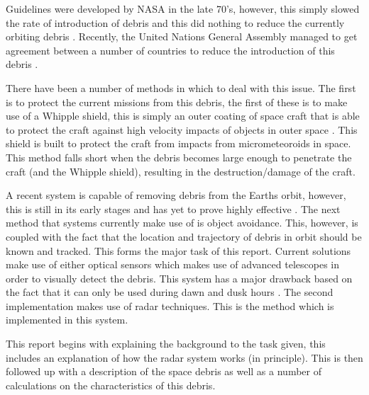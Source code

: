 \documentclass[11pt]{witseiepaper}
\begin{document}
Guidelines were developed by NASA in the late 70's, however, this simply slowed the rate of introduction of debris and this did nothing to reduce the currently orbiting debris \cite{spaceDebrisGuide}. Recently, the United Nations General Assembly managed to get agreement between a number of countries to reduce the introduction of this debris \cite{debrisGuidelinesAgreement}.

There have been a number of methods in which to deal with this issue. The first is to protect the current missions from this debris, the first of these is to make use of a Whipple shield, this is simply an outer coating of space craft that is able to protect the craft against high velocity impacts of objects in outer space \cite{Whipple}. This shield is built to protect the craft from impacts from micrometeoroids in space.
This method falls short when the debris becomes large enough to penetrate the craft (and the Whipple shield), resulting in the destruction/damage of the craft.

A recent system is capable of removing debris from the Earths orbit, however, this is still in its early stages and has yet to prove highly effective \cite{removalSpaceDebris}.
The next method that systems currently make use of is object avoidance. This, however, is coupled with the fact that the location and trajectory of debris in orbit should be known and tracked. This forms the major task of this report.
Current solutions make use of either optical sensors which makes use of advanced telescopes in order to visually detect the debris. This system has a major drawback based on the fact that it can only be used during dawn and dusk hours \cite{OrbitalDebrisTechnicalAssessment,telescope,ZenithRanging}.
The second implementation makes use of radar techniques. This is the method which is implemented in this system.

This report begins with explaining the background to the task given, this includes an explanation of how the radar system works (in principle).
This is then followed up with a description of the space debris as well as a number of calculations on the characteristics of this debris.

\end{document}
